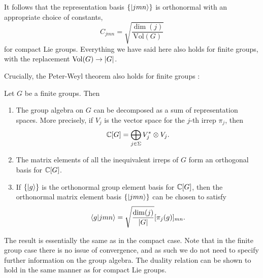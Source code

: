It follows that the representation basis $\{\ket{jmn}\}$ is orthonormal with an appropriate choice of constants,
\begin{equation*}
    C_{jmn} = \sqrt{\frac{\dim(j)}{\mathrm{Vol}(G)} }
\end{equation*}
for compact Lie groups.
Everything we have said here also holds for finite groups, with the replacement $\mathrm{Vol}(G) \to \abs{G} $.

Crucially, the Peter-Weyl theorem also holds for finite groups \cite[Sec.~6.2]{serre1967representations}:

\begin{theorem}
    Let $G$ be a finite groups.
    Then
    \begin{enumerate}[label=(\roman*)]
        \item The group algebra on $G$ can be decomposed as a sum of representation spaces.
            More precisely, if $V_j$ is the vector space for the $j$-th irrep $\pi_j$, then
            \begin{equation}
                \mathbb{C}[G] = \bigoplus_{j \in \Sigma} V_{j}^{\ast} \otimes V_{j}.
            \end{equation}

        \item The matrix elements of all the inequivalent irreps of $G$ form an orthogonal basis for $\mathbb{C}[G] $.

        \item If $\{\ket{g}\}$ is the orthonormal group element basis for $\mathbb{C}[G] $, then the orthonormal matrix element basis $\{\ket{jmn}\}$ can be chosen to satisfy
            \begin{equation}
                \braket{g}{jmn} =
                \sqrt{\frac{\dim(j)}{\abs{G}} } [\pi_j(g)]_{mn}.
            \end{equation}
    \end{enumerate}
\end{theorem}

The result is essentially the same as in the compact case.
Note that in the finite group case there is no issue of convergence, and as such we do not need to specify further information on the group algebra.
The duality relation can be shown to hold in the same manner as for compact Lie groups.
